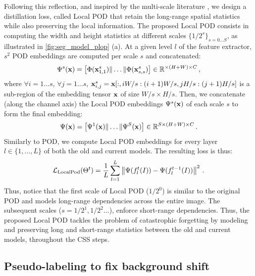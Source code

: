 Following this reflection, and inspired by the multi-scale literature
\citep{lazbnik2006spatial_pyramid_matching,he2014spatialpyramidpooling}, we design a distillation
loss, called Local POD that retain the long-range spatial statistics while also preserving the local
information. The proposed Local POD consists in computing the width and height statistics at
different scales $\{1/2^s\}_{s=0 \dots S}$, as illustrated in \autoref{fig:seg_model_plop} (a). At a
given level $l$ of the feature extractor, $s^2$ POD embeddings are computed per scale $s$ and
concatenated:
%
\begin{equation}
    \Psi^s(\mathbf{x}) = \left[ \Phi(\mathbf{x}^s_{1,1}) \| \dots \| \Phi(\mathbf{x}^s_{s,s}) \right] \in \mathbb{R}^{\times (H + W) \times C}\,,
    \label{eq:seg_localpod_embedding1}
\end{equation}
%
where $\forall i = 1 \dots s$, $\forall j = 1 \dots s$, $\mathbf{x}^s_{i,j} = \mathbf{x}[:, i W/s:(i+1) W/s, j
        H/s:(j+1) H/s]$ is a sub-region of the embedding tensor $\mathbf{x}$ of size $W/s \times H/s$.
Then, we concatenate (along the channel axis) the Local POD embeddings $\Psi^s(\mathbf{x})$ of each
scale $s$ to form the final embedding:
%
\begin{equation}
    \Psi(\mathbf{x}) = \left[ \Psi^1(\mathbf{x}) \| \dots \| \Psi^S(\mathbf{x}) \right] \in \mathbb{R}^{S \times (H + W) \times C}\,.
    \label{eq:seg_local_pod}
\end{equation}
%
Similarly to POD, we compute Local POD embeddings for every layer $l \in \{1, \dots, L\}$ of both
the old and current models. The resulting loss is thus:
%
\begin{equation}
    \mathcal{L}_{\scriptstyle\text{LocalPod}}(\Theta^t) = \frac{1}{L} \sum_{l = 1}^L \left\Vert  {\Psi}(f^t_l(I)) -  {\Psi}(f^{t-1}_l(I)) \right\Vert^2\,.
    \label{eq:seg_local_pod_loss}
\end{equation}
%
Thus, notice that the first scale of Local POD ($1/2^0$) is similar to the original POD and models
long-range dependencies across the entire image. The subsequent scales ($s=1/2^1, 1/2^2 \dots$),
enforce short-range dependencies. Thus, the proposed Local POD tackles the problem of catastrophic
forgetting by modeling and preserving long and short-range statistics between the old and current
models, throughout the \ac{CSS} steps.


\subsection{Pseudo-labeling to fix background shift}\label{sec:seg_hardpl}

